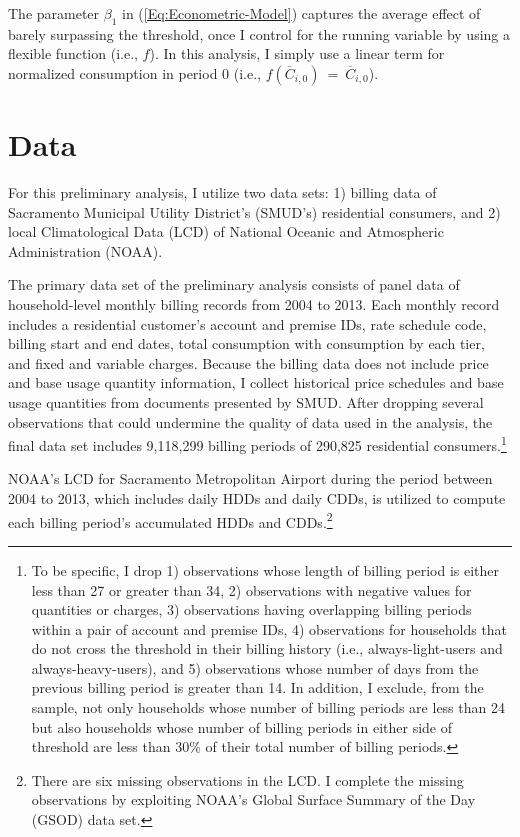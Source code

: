 The parameter $\beta_{1}$ in (\ref{Eq:Econometric-Model}) captures the average effect of barely surpassing the threshold, once I control for the running variable by using a flexible function (i.e., $f$). In this analysis, I simply use a linear term for normalized consumption in period 0 (i.e., $f(\overline{C}_{i,0}) \ = \ \overline{C}_{i,0}$).


\section{Data}
For this preliminary analysis, I utilize two data sets: 1) billing data of Sacramento Municipal Utility District's (SMUD's) residential consumers, and 2) local Climatological Data (LCD) of National Oceanic and Atmospheric Administration (NOAA).

The primary data set of the preliminary analysis consists of panel data of household-level monthly billing records from 2004 to 2013. Each monthly record includes a residential customer's account and premise IDs, rate schedule code, billing start and end dates, total consumption with consumption by each tier, and fixed and variable charges. Because the billing data does not include price and base usage quantity information, I collect historical price schedules and base usage quantities from documents presented by SMUD. After dropping several observations that could undermine the quality of data used in the analysis, the final data set includes 9,118,299 billing periods of 290,825 residential consumers.\footnote{To be specific, I drop 1) observations whose length of billing period is either less than 27 or greater than 34, 2) observations with negative values for quantities or charges, 3) observations having overlapping billing periods within a pair of account and premise IDs, 4) observations for households that do not cross the threshold in their billing history (i.e., always-light-users and always-heavy-users), and 5) observations whose number of days from the previous billing period is greater than 14. In addition, I exclude, from the sample, not only households whose number of billing periods are less than 24 but also households whose number of billing periods in either side of threshold are less than 30\% of their total number of billing periods.}

NOAA's LCD for Sacramento Metropolitan Airport during the period between 2004 to 2013, which includes daily HDDs and daily CDDs, is utilized to compute each billing period's accumulated HDDs and CDDs.\footnote{There are six missing observations in the LCD. I complete the missing observations by exploiting NOAA's Global Surface Summary of the Day (GSOD) data set.}

